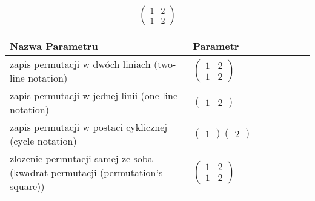 \documentclass[12pt]{article}
\begin{document}
\subsection{}
\begin{center}
\[
\begin{pmatrix}
	1 & 2 \\ 
	1 & 2 
\end{pmatrix}
\]

\begin{tabular}{|m{0.6\linewidth}|m{0.4\linewidth}|}
	\hline
	Nazwa Parametru & Parametr \\
	\hline
	zapis permutacji w dwóch liniach (two-line notation) & $\begin{pmatrix} 1 & 2 \\ 
1 & 2 \end{pmatrix}$ \\ 
	\hline
	zapis permutacji w jednej linii (one-line notation) & $\begin{pmatrix} 1 & 2 \end{pmatrix}$ \\ 
	\hline
	zapis permutacji w postaci cyklicznej (cycle notation) & $\begin{pmatrix} 1 \end{pmatrix} \begin{pmatrix} 2 \end{pmatrix} $ \\ 
	\hline
	zlozenie permutacji samej ze soba (kwadrat permutacji (permutation's square)) & $\begin{pmatrix} 1 & 2 \\ 
1 & 2 \end{pmatrix}$ \\ 
	\hline
\end{tabular}
\end{center}
\end{document}
